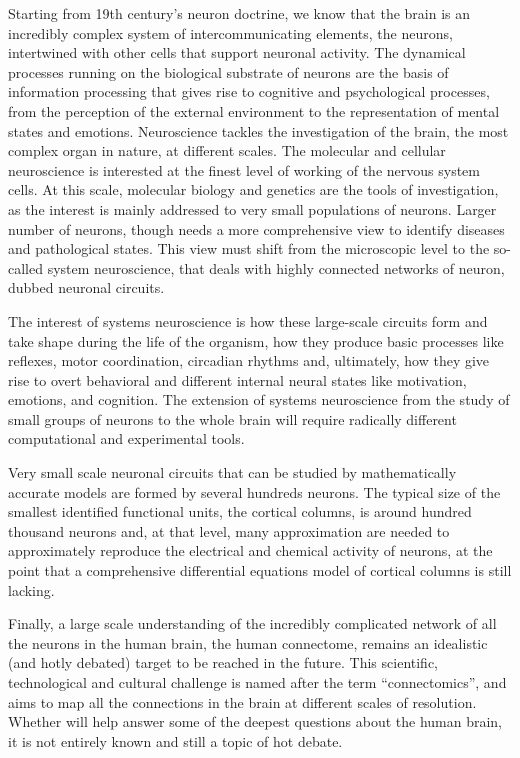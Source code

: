 Starting from 19th century’s neuron doctrine, we know that the brain is an incredibly complex system of intercommunicating elements, the neurons, intertwined with other cells that support neuronal activity. 
The dynamical processes running on the biological substrate of neurons are the basis of information processing that gives rise to cognitive and psychological processes, from the perception of the external environment to the representation of mental states and emotions.
Neuroscience tackles the investigation of the brain, the most complex organ in nature, at different scales. The molecular and cellular neuroscience is interested at the finest level of working of the nervous system cells. At this scale, molecular biology and genetics are the tools of investigation, as the interest is mainly addressed to very small populations of neurons. 
Larger number of neurons, though needs a more comprehensive view to identify diseases and pathological states. This view must shift from the microscopic level to the so-called system neuroscience, that deals with highly connected networks of neuron, dubbed neuronal circuits.

The interest of systems neuroscience is how these large-scale circuits form and take shape during the life of the organism, how they produce basic processes like reflexes, motor coordination, circadian rhythms and, ultimately, how they give rise to overt behavioral and different internal neural states like motivation, emotions, and cognition.
The extension of systems neuroscience from the study of small groups of neurons to the whole brain will require radically different computational and experimental tools.

Very small scale neuronal circuits that can be studied by mathematically accurate models are formed by several hundreds neurons. The typical size of the smallest identified functional units, the cortical columns, is around hundred thousand neurons and, at that level, many approximation are needed to approximately reproduce the electrical and chemical activity of neurons, at the point that a comprehensive differential equations model of cortical columns is still lacking. 

Finally, a large scale understanding of the incredibly complicated network of all the neurons in the human brain, the human connectome, remains an idealistic (and hotly debated) target to be reached in the future. This scientific, technological and cultural challenge is named after the term ``connectomics'', and aims to map all the connections in the brain at different scales of resolution. Whether will help answer some of the deepest questions about the human brain, it is not entirely known and still a topic of hot debate.


